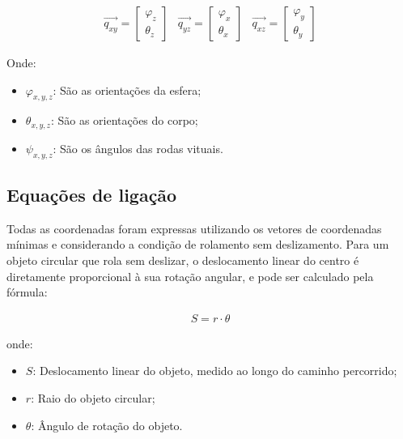 \begin{equation}
\label{eq:1}
\begin{array}{ccc}
\vec{q_{xy}} =
\begin{bmatrix}
\varphi_z \\
\theta_z
\end{bmatrix}
& 
\vec{q_{yz}} =
\begin{bmatrix}
\varphi_x \\
\theta_x
\end{bmatrix}
& 
\vec{q_{xz}} =
\begin{bmatrix}
\varphi_y \\
\theta_y
\end{bmatrix}
\end{array}
\end{equation}

Onde:

\begin{itemize}
    \item $\varphi_{x,y,z}$: São as orientações da esfera;
    \item $\theta_{x,y,z}$: São as orientações do corpo;
    \item $\psi_{x,y,z}$: São os ângulos das rodas vituais.
\end{itemize}

\subsection{Equações de ligação}

Todas as coordenadas foram expressas utilizando os vetores de coordenadas mínimas e considerando a condição de rolamento sem deslizamento. Para um objeto circular que rola sem deslizar, o deslocamento linear do centro é diretamente proporcional à sua rotação angular, e pode ser calculado pela fórmula:

\begin{equation*}
    \begin{aligned}
        S = r \cdot \theta
    \end{aligned}
\end{equation*}

onde:

\begin{itemize}
    \item \( S \): Deslocamento linear do objeto, medido ao longo do caminho percorrido;
    \item \( r \): Raio do objeto circular;
    \item \( \theta \): Ângulo de rotação do objeto.
\end{itemize}

